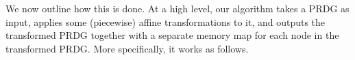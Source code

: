 

We now outline how this is done.  At a high level, our algorithm takes a PRDG
as input, applies some (piecewise) affine transformations to it, and outputs
the transformed PRDG together with a separate memory map for each node in the
transformed PRDG.  More specifically, it works as follows.

